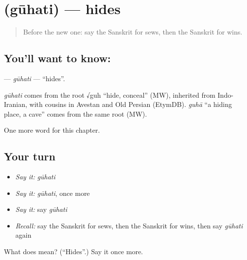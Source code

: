 \section[\texorpdfstring{\sk{गूहति} (gūhati)}{गूहति (gūhati)}]{ (gūhati) — hides}

\label{lesson:SA-C137-guhati}



\begin{quote}
Before the new one: say the Sanskrit for sews, then the Sanskrit for wins.
\end{quote}

\subsection*{You'll want to know: }
\textbf{} — \emph{gūhati} — \textquotedblleft{}hides\textquotedblright{}.

\begin{cousinweb}
\emph{gūhati} comes from the root √guh \textquotedblleft{}hide, conceal\textquotedblright{} (MW), inherited from Indo-Iranian, with cousins in Avestan and Old Persian (EtymDB). \emph{guhā} \textquotedblleft{}a hiding place, a cave\textquotedblright{} comes from the same root (MW).
\end{cousinweb}

\begin{grammarlens}[title={What you've built}]
One more word for this chapter.
\end{grammarlens}

\subsection*{Your turn}
\begin{itemize}
\raggedright
  \item \emph{Say it:} \emph{gūhati}
  \item \emph{Say it:} \emph{gūhati}, once more
  \item \emph{Say it:} say \emph{gūhati}
  \item \emph{Recall:} say the Sanskrit for sews, then the Sanskrit for wins, then say \emph{gūhati} again
\end{itemize}

\begin{tcolorbox}[breakable,colback=teal!4,colframe=teal!35!black,title={Before you move on}]
What does  mean? (\textquotedblleft{}Hides\textquotedblright{}.) Say it once more.
\end{tcolorbox}
